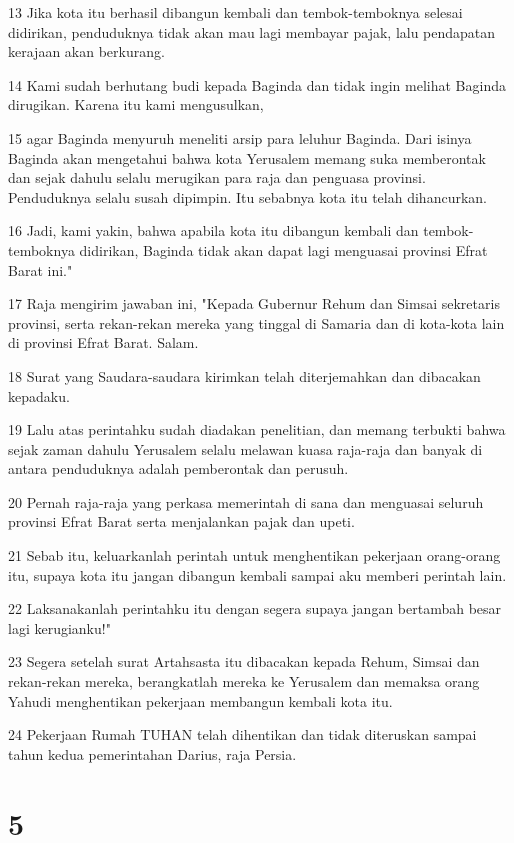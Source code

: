 \par 13 Jika kota itu berhasil dibangun kembali dan tembok-temboknya selesai didirikan, penduduknya tidak akan mau lagi membayar pajak, lalu pendapatan kerajaan akan berkurang.
\par 14 Kami sudah berhutang budi kepada Baginda dan tidak ingin melihat Baginda dirugikan. Karena itu kami mengusulkan,
\par 15 agar Baginda menyuruh meneliti arsip para leluhur Baginda. Dari isinya Baginda akan mengetahui bahwa kota Yerusalem memang suka memberontak dan sejak dahulu selalu merugikan para raja dan penguasa provinsi. Penduduknya selalu susah dipimpin. Itu sebabnya kota itu telah dihancurkan.
\par 16 Jadi, kami yakin, bahwa apabila kota itu dibangun kembali dan tembok-temboknya didirikan, Baginda tidak akan dapat lagi menguasai provinsi Efrat Barat ini."
\par 17 Raja mengirim jawaban ini, "Kepada Gubernur Rehum dan Simsai sekretaris provinsi, serta rekan-rekan mereka yang tinggal di Samaria dan di kota-kota lain di provinsi Efrat Barat. Salam.
\par 18 Surat yang Saudara-saudara kirimkan telah diterjemahkan dan dibacakan kepadaku.
\par 19 Lalu atas perintahku sudah diadakan penelitian, dan memang terbukti bahwa sejak zaman dahulu Yerusalem selalu melawan kuasa raja-raja dan banyak di antara penduduknya adalah pemberontak dan perusuh.
\par 20 Pernah raja-raja yang perkasa memerintah di sana dan menguasai seluruh provinsi Efrat Barat serta menjalankan pajak dan upeti.
\par 21 Sebab itu, keluarkanlah perintah untuk menghentikan pekerjaan orang-orang itu, supaya kota itu jangan dibangun kembali sampai aku memberi perintah lain.
\par 22 Laksanakanlah perintahku itu dengan segera supaya jangan bertambah besar lagi kerugianku!"
\par 23 Segera setelah surat Artahsasta itu dibacakan kepada Rehum, Simsai dan rekan-rekan mereka, berangkatlah mereka ke Yerusalem dan memaksa orang Yahudi menghentikan pekerjaan membangun kembali kota itu.
\par 24 Pekerjaan Rumah TUHAN telah dihentikan dan tidak diteruskan sampai tahun kedua pemerintahan Darius, raja Persia.

\chapter{5}

